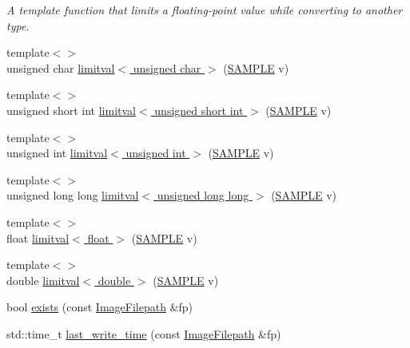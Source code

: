 \begin{DoxyCompactItemize}
\begin{DoxyCompactList}\small\item\em A template function that limits a floating-\/point value while converting to another type. \end{DoxyCompactList}\item 
{\footnotesize template$<$$>$ }\\unsigned char \hyperlink{namespace_photo_finish_ac8676e30ad327c0a4efd5a88b25cb4a0}{limitval$<$ unsigned char $>$} (\hyperlink{sample_8h_afc597c76b4f04a2da506a240d51d89a0}{S\+A\+M\+P\+LE} v)
\item 
{\footnotesize template$<$$>$ }\\unsigned short int \hyperlink{namespace_photo_finish_ab0f7bd944750509695fbac805f21ed42}{limitval$<$ unsigned short int $>$} (\hyperlink{sample_8h_afc597c76b4f04a2da506a240d51d89a0}{S\+A\+M\+P\+LE} v)
\item 
{\footnotesize template$<$$>$ }\\unsigned int \hyperlink{namespace_photo_finish_a0b7985a8f707df80ad005bccda7ddff3}{limitval$<$ unsigned int $>$} (\hyperlink{sample_8h_afc597c76b4f04a2da506a240d51d89a0}{S\+A\+M\+P\+LE} v)
\item 
{\footnotesize template$<$$>$ }\\unsigned long long \hyperlink{namespace_photo_finish_a4414478a05e84d6082884d9b16f7c6f5}{limitval$<$ unsigned long long $>$} (\hyperlink{sample_8h_afc597c76b4f04a2da506a240d51d89a0}{S\+A\+M\+P\+LE} v)
\item 
{\footnotesize template$<$$>$ }\\float \hyperlink{namespace_photo_finish_a56b580dadd8be41410c8722bc908a8fb}{limitval$<$ float $>$} (\hyperlink{sample_8h_afc597c76b4f04a2da506a240d51d89a0}{S\+A\+M\+P\+LE} v)
\item 
{\footnotesize template$<$$>$ }\\double \hyperlink{namespace_photo_finish_a252538ec5e799456b41654d3f4431c5d}{limitval$<$ double $>$} (\hyperlink{sample_8h_afc597c76b4f04a2da506a240d51d89a0}{S\+A\+M\+P\+LE} v)
\item 
bool \hyperlink{namespace_photo_finish_aabc75ddd4dcb561448e15c30b0efa906}{exists} (const \hyperlink{class_photo_finish_1_1_image_filepath}{Image\+Filepath} \&fp)
\item 
std\+::time\+\_\+t \hyperlink{namespace_photo_finish_a125acf6d378db915789ac48a723be3a3}{last\+\_\+write\+\_\+time} (const \hyperlink{class_photo_finish_1_1_image_filepath}{Image\+Filepath} \&fp)
\item 

\end{DoxyCompactItemize}
